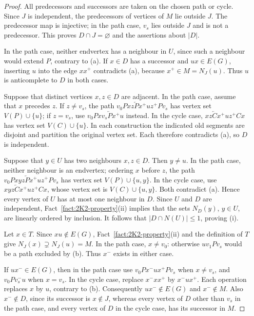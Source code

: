 \documentclass[11pt]{article}
\numberwithin{equation}{section}
\theoremstyle{plain}
\theoremstyle{definition}
\theoremstyle{plain}
\begin{document}
\begin{proof}
All predecessors and successors are taken on the chosen path or
cycle. Since $J$ is independent, the predecessors of vertices of
$M$ lie outside $J$. The predecessor map is injective; in the path
case, $v_s$ lies outside $J$ and is not a predecessor. This proves
$D\cap J=\varnothing$ and the assertions about $|D|$.

In the path case, neither endvertex has a neighbour in $U$, since
such a neighbour would extend $P$, contrary to (a). If $x\in D$
has a successor and $ux\in E(G)$, inserting $u$ into the edge
$xx^+$    contradicts (a), because $x^+\in M=N_J(u)$.
Thus $u$ is anticomplete to $D$ in both cases.

Suppose that distinct vertices $x,z\in D$ are adjacent. In the
path case, assume that $x$ precedes $z$. If $z\neq v_s$, the path
$v_0P xz\overleftarrow P x^+uz^+P v_s$ has vertex set
$V(P)\cup\{u\}$; if $z=v_s$, use
$v_0P xv_s\overleftarrow P x^+u$ instead. In the cycle case,
$xz\overleftarrow C x^+uz^+C x$ has vertex set $V(C)\cup\{u\}$.
In each construction the indicated old segments are disjoint and
partition the original vertex set. Each therefore contradicts (a),
so $D$ is independent.

Suppose that $y\in U$ has two neighbours $x,z\in D$. Then $y\neq u$.
In the path case, neither neighbour is an endvertex; ordering $x$
before $z$, the path $v_0P xyz\overleftarrow P x^+uz^+P v_s$
has vertex set $V(P)\cup\{u,y\}$. In the cycle case, use
$xyz\overleftarrow C x^+uz^+C x$, whose vertex set is
$V(C)\cup\{u,y\}$. Both contradict (a). Hence every vertex of
$U$ has at most one neighbour in $D$. Since $U$ and $D$ are
independent, Fact~\ref{fact:2K2-property}\textup{(ii)} implies that
the sets $N_D(y)$, $y\in U$, are linearly ordered by inclusion.
It follows that $|D\cap N(U)|\leq1$, proving (i).

Let $x\in T$. Since $xu\notin E(G)$,
Fact~\ref{fact:2K2-property}\textup{(ii)} and the definition of $T$
give $N_J(x)\supsetneq N_J(u)=M$. In the path case, $x\neq v_0$:
otherwise $uv_1P v_s$ would be a path excluded by (b).
Thus $x^-$ exists in either case.

If $ux^-\in E(G)$, then in the path case use
$v_0P x^-ux^+P v_s$ when $x\neq v_s$, and $v_0P v_s^-u$
when $x=v_s$. In the cycle case, replace $x^-xx^+$ by $x^-ux^+$.
Each operation replaces $x$ by $u$, contrary to (b).
Consequently $ux^-\notin E(G)$ and $x^-\notin M$.
Also $x^-\notin D$, since its successor is $x\notin J$, whereas
every vertex of $D$ other than $v_s$ in the path case, and every
vertex of $D$ in the cycle case, has its successor in $M$.


\end{proof}
\end{document}
